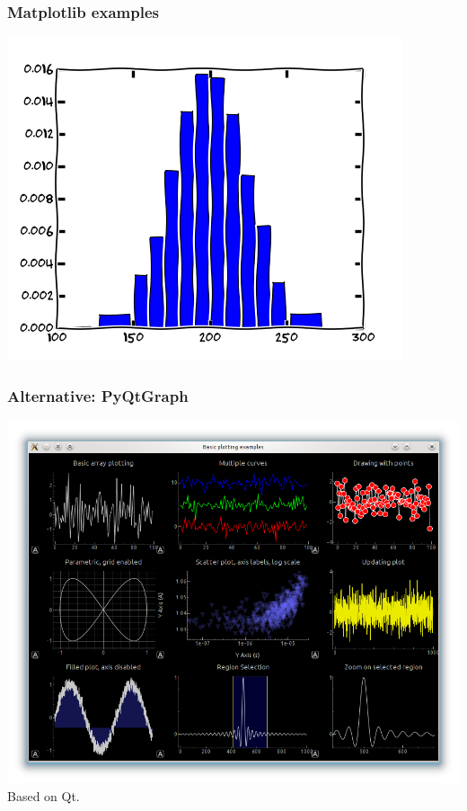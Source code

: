 \documentclass[14pt]{beamer}
\begin{document}
\begin{frame}
\frametitle{Matplotlib examples}
\includegraphics[width=\textwidth]{histogram_demo_extended_01.png}
\end{frame}

\begin{frame}
\frametitle{Alternative: PyQtGraph}
\includegraphics[width=\textwidth]{plotting_pyqtgraph.png}\\
Based on Qt.
\end{frame}
\end{document}
